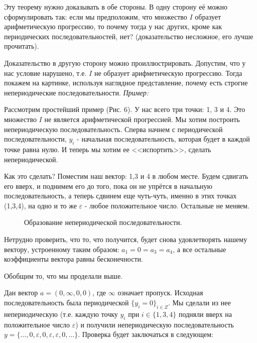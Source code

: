 \documentclass[russian]{lecture-notes}
\begin{document}
Эту теорему нужно доказывать в обе стороны. В одну сторону её можно сформулировать так: если мы предположим, что множество $I$ образует арифметическую прогрессию, то почему тогда у нас других, кроме как периодических последовательностей, нет? (доказательство несложное, его лучше прочитать).

Доказательство в другую сторону можно проиллюстрировать. Допустим,
что у нас условие нарушено, т.е. $I$ не образует арифметическую прогрессию. Тогда покажем на картинке, используя наглядное представление, почему есть строгие непериодические последовательности.
 \emph{Пример:}

Рассмотрим простейший пример (Рис. 6). У нас всего три точки: 1, 3 и 4. Это множество $I$ не является арифметической прогрессией. Мы хотим построить непериодическую последовательность. Сперва начнем с периодической последовательности, $y_i$ - начальная последовательность, которая будет в каждой точке равна нулю. И теперь мы хотим ее <<испортить>>, сделать непериодической.

Как это сделать? Поместим наш вектор: 1,3 и 4 в любом месте. Будем сдвигать его вверх, и поднимем его до того, пока он не упрётся в начальную последовательность, а теперь сдвинем еще чуть-чуть, именно в этих точках (1,3,4), на одно и то же $\varepsilon$ - любое положительное число. Остальные не меняем.

\begin{figure}[h!]
\caption{Образование непериодической последовательности.}
\end{figure}

Нетрудно проверить, что то, что получится, будет снова удовлетворять нашему вектору, устроенному таким образом: $a_1=0=a_3=a_4$,
а все остальные коэффициенты вектора равны бесконечности.


Обобщим то, что мы проделали выше.

Дан вектор $a = (0,\infty,0,0)$, где $\infty$ означает пропуск.
Исходная последовательность была периодической $\{y_i=0\} _{i\in Z}$. Мы сделали из нее непериодическую (т.е. каждую точку  $y_i$ при $i\in\{1,3,4\}$ подняли вверх на положительное число $\varepsilon$) и получили непериодическую последовательность $y=\{\ldots,0,\varepsilon,0,\varepsilon,\varepsilon,0,\ldots\}$. Проверка будет заключаться в следующем:
\end{document}
